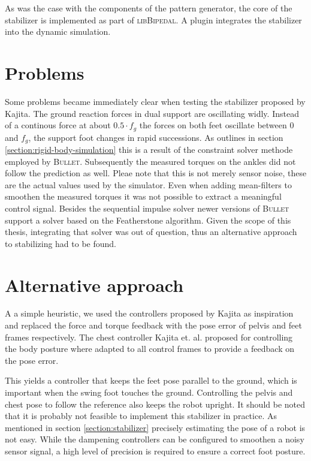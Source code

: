 \documentclass[english,ngerman]{KITreprt}
\newcommand{\name}[1]{\textsc{#1}}
\begin{document}
As was the case with the components of the pattern generator, the core
of the stabilizer is implemented as part of \name{libBipedal}. A plugin
integrates the stabilizer into the dynamic simulation.

\section{Problems}\label{problems}

Some problems became immediately clear when testing the stabilizer
proposed by Kajita. The ground reaction forces in dual support are
oscillating widly. Instead of a continous force at about $0.5 \cdot f_g$
the forces on both feet oscillate between $0$ and $f_g$, the support
foot changes in rapid successions. As outlines in section
\ref{section:rigid-body-simulation} this is a result of the constraint
solver methode employed by \name{Bullet}. Subsequently the measured
torques on the ankles did not follow the prediction as well. Pleae note
that this is not merely sensor noise, these are the actual values used
by the simulator. Even when adding mean-filters to smoothen the measured
torques it was not possible to extract a meaningful control signal.
Besides the sequential impulse solver newer versions of \name{Bullet}
support a solver based on the Featherstone algorithm. Given the scope of
this thesis, integrating that solver was out of question, thus an
alternative approach to stabilizing had to be found.

\section{Alternative approach}\label{section:alternative-approach}

A a simple heuristic, we used the controllers proposed by Kajita as
inspiration and replaced the force and torque feedback with the pose
error of pelvis and feet frames respectively. The chest controller
Kajita et. al. proposed for controlling the body posture where adapted
to all control frames to provide a feedback on the pose error.

This yields a controller that keeps the feet pose parallel to the
ground, which is important when the swing foot touches the ground.
Controlling the pelvis and chest pose to follow the reference also keeps
the robot upright. It should be noted that it is probably not feasible
to implement this stabilizer in practice. As mentioned in section
\ref{section:stabilizer} precisely estimating the pose of a robot is not
easy. While the dampening controllers can be configured to smoothen a
noisy sensor signal, a high level of precision is required to ensure a
correct foot posture.
\end{document}
